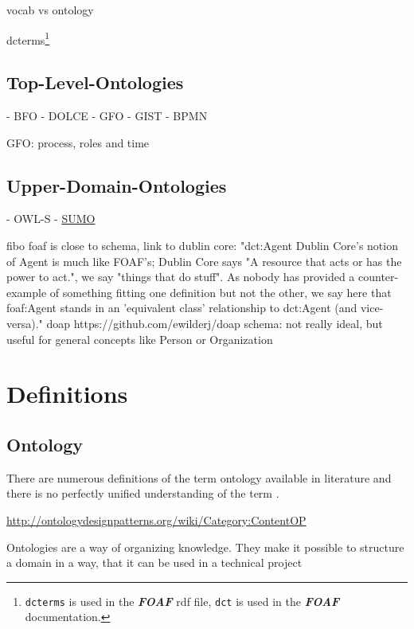 \documentclass[a4paper, DIV=13, BCOR=0cm]{scrbook}
\newcommand{\pn}[1]{\textit{\textbf{#1}}}
\begin{document}
vocab vs ontology

dcterms\footnote{\texttt{dcterms} is used in the \pn{FOAF} rdf file, \texttt{dct} is used in the \pn{FOAF} documentation.}

\subsection{Top-Level-Ontologies}
- BFO %
- DOLCE
- GFO
- GIST
- BPMN  \cite{2014foisbpmn}

GFO: process, roles and time
\subsection{Upper-Domain-Ontologies}
- OWL-S
- \href{https://en.wikipedia.org/wiki/Suggested_Upper_Merged_Ontology}{SUMO}

\gls{fibo}
\gls{foaf} is close to schema, link to dublin core: "dct:Agent
Dublin Core's notion of Agent is much like FOAF's; Dublin Core says "A resource that acts or has the power to act.", we say "things that do stuff". As nobody has provided a counter-example of something fitting one definition but not the other, we say here that foaf:Agent stands in an 'equivalent class' relationship to dct:Agent (and vice-versa)." \cite[
External Vocabulary References]{Dan-Brickley2014FOAF-Vocabulary}
\gls{doap} https://github.com/ewilderj/doap
\gls{schema}: not really ideal, but useful for general concepts like Person or Organization



\section{Definitions}

\subsection{Ontology}
There are numerous definitions of the term ontology available in literature \cite[p.\,4, section 1.1.2.1]{loebe2015ontological} and there is no perfectly unified understanding of the term \cite{Hesse_2014}.

\url{http://ontologydesignpatterns.org/wiki/Category:ContentOP}

Ontologies are a way of organizing knowledge. They make it possible to structure a domain in a way, that it can be used in a technical project 
\end{document}
